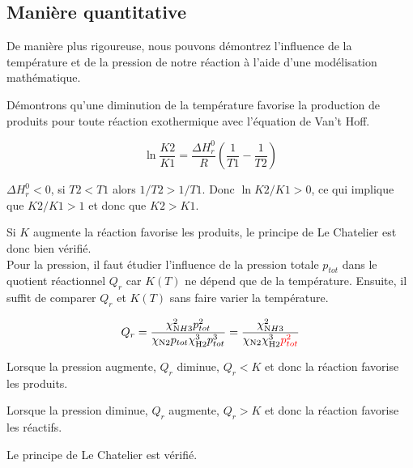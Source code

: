 \documentclass[10pt,a4paper]{article}
\begin{document}
\subsection{Manière quantitative}

De manière plus rigoureuse, nous pouvons démontrez l'influence de la température et de la pression de notre réaction à l'aide d'une modélisation mathématique.

Démontrons qu'une diminution de la température favorise la production de produits pour toute réaction exothermique avec l'équation de Van't Hoff.

$$\ln{\frac{K2}{K1}} = \frac{\Delta H^0_r}{R}(\frac{1}{T1} - \frac{1}{T2}) $$ 

$ \Delta H^0_r < 0$, si $T2<T1$ alors $1/T2 > 1/T1$. Donc $\ln{K2/K1} > 0$, ce qui implique que $K2/K1>1$  et donc que $ K2>K1$.

Si $K$ augmente la réaction favorise les produits, le principe de Le Chatelier est donc bien vérifié.
\\

Pour la pression, il faut étudier l'influence de la pression totale $p_{tot}$ dans le quotient réactionnel $Q_r$ car $K(T)$ ne dépend que de la température. Ensuite, il suffit de comparer $Q_r$ et  $K(T)$ sans faire varier la température. 

$$ Q_r= \frac{\chi_{\ce NH3}^2 p_{tot}^2}{\chi_{\ce N2} p_{tot} \chi_{\ce H2}^3 p_{tot}^3}=\frac{\chi_{\ce NH3}^2}{\chi_{\ce N2} \chi_{\ce H2}^3 \textcolor{red}{p_{tot}^2}}$$ 

Lorsque la pression augmente, $Q_r$ diminue, $Q_r < K$ et donc la réaction favorise les produits.
 
Lorsque la pression diminue, $Q_r$ augmente, $Q_r > K$ et donc la réaction favorise les réactifs.

Le principe de Le Chatelier est vérifié.
\end{document}
